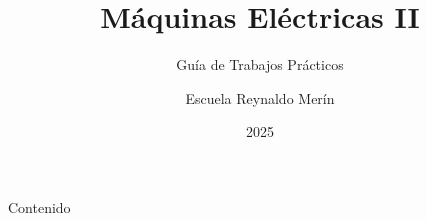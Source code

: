 \documentclass[10pt, aspectratio=169]{beamer}
\title{Máquinas Eléctricas II}
\subtitle{Guía de Trabajos Prácticos}
\author{Escuela Reynaldo Merín}
\date{2025}
\begin{document}
\begin{frame}
  \titlepage
\end{frame}

\begin{frame}{Contenido}
  \tableofcontents
\end{frame}


\end{document}
